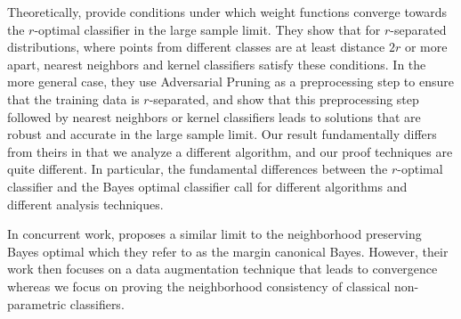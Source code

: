 
Theoretically, \cite{Bhattacharjee20} provide conditions under which weight functions converge towards the $r$-optimal classifier in the large sample limit. They show that for $r$-separated distributions, where points from different classes are at least distance $2r$ or more apart, nearest neighbors and kernel classifiers satisfy these conditions. In the more general case, they use Adversarial Pruning as a preprocessing step to ensure that the training data is $r$-separated, and show that this preprocessing step followed by nearest neighbors or kernel classifiers leads to solutions that are robust and accurate in the large sample limit. Our result fundamentally differs from theirs in that we analyze a different algorithm, and our proof techniques are quite different. In particular, the fundamental differences between the $r$-optimal classifier and the \natural\emph{ }Bayes optimal classifier call for different algorithms and different analysis techniques.

In concurrent work, \cite{Chowdhury21} proposes a similar limit to the neighborhood preserving Bayes optimal which they refer to as the margin canonical Bayes. However, their work then focuses on a data augmentation technique that leads to convergence whereas we focus on proving the neighborhood consistency of classical non-parametric classifiers.



%
%
%
%
%
%
%